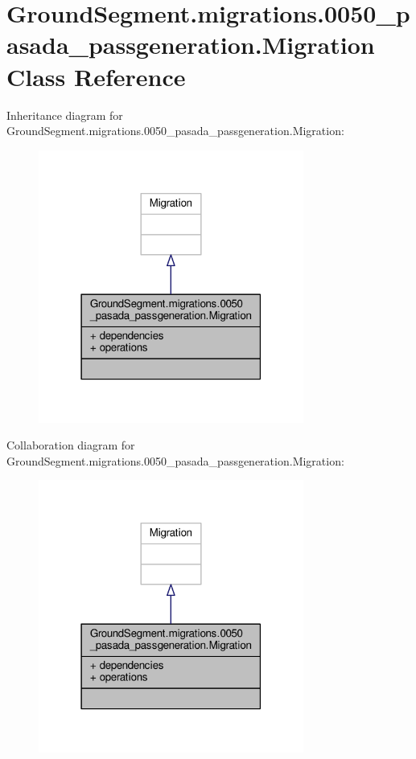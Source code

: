 \hypertarget{class_ground_segment_1_1migrations_1_10050__pasada__passgeneration_1_1_migration}{}\section{Ground\+Segment.\+migrations.0050\+\_\+pasada\+\_\+passgeneration.Migration Class Reference}
\label{class_ground_segment_1_1migrations_1_10050__pasada__passgeneration_1_1_migration}


Inheritance diagram for Ground\+Segment.\+migrations.0050\+\_\+pasada\+\_\+passgeneration.Migration\+:\nopagebreak
\begin{figure}[H]
\begin{center}
\leavevmode
\includegraphics[width=247pt]{class_ground_segment_1_1migrations_1_10050__pasada__passgeneration_1_1_migration__inherit__graph}
\end{center}
\end{figure}


Collaboration diagram for Ground\+Segment.\+migrations.0050\+\_\+pasada\+\_\+passgeneration.Migration\+:\nopagebreak
\begin{figure}[H]
\begin{center}
\leavevmode
\includegraphics[width=247pt]{class_ground_segment_1_1migrations_1_10050__pasada__passgeneration_1_1_migration__coll__graph}
\end{center}
\end{figure}
